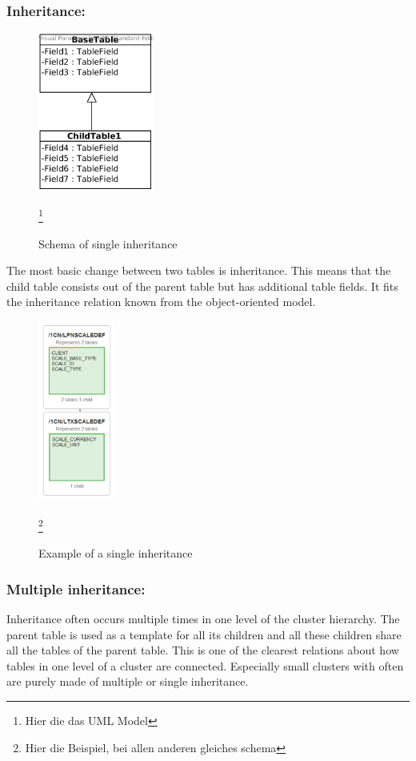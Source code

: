 \documentclass[10pt, journal, twocolumn]{IEEEtran}
\begin{document}
\subsubsection{Inheritance:}
\begin{figure}[h]
\centering
\includegraphics[width=1.5in]{SingleInheritance}
\caption{Schema of single inheritance}
\footnote{Hier die das UML Model}
\end{figure}
The most basic change between two tables is inheritance. This means that the child table consists out of the parent table but has additional table fields. It fits the inheritance relation known from the object-oriented model.
\begin{figure}[h]
\centering
\includegraphics[width=1in]{SingleInheritance_ex}
\caption{Example of a single inheritance}
\footnote{Hier die Beispiel, bei allen anderen gleiches schema}
\end{figure}
\subsubsection{Multiple inheritance:}
Inheritance often occurs multiple times in one level of the cluster hierarchy. The parent table is used as a template for all its children and all these children share all the tables of the parent table. This is one of the clearest relations about how tables in one level of a cluster are connected. Especially small clusters with often are purely made of multiple or single inheritance.
\end{document}
